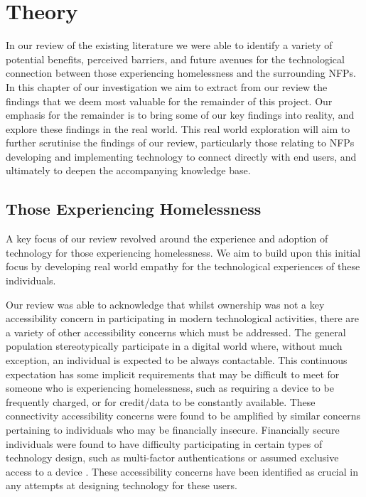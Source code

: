 \chapter{Theory}

In our review of the existing literature we were able to identify a variety of potential benefits, perceived barriers, and future avenues for the technological connection between those experiencing homelessness and the surrounding NFPs. In this chapter of our investigation we aim to extract from our review the findings that we deem most valuable for the remainder of this project. Our emphasis for the remainder is to bring some of our key findings into reality, and explore these findings in the real world. This real world exploration will aim to further scrutinise the findings of our review, particularly those relating to NFPs developing and implementing technology to connect directly with end users, and ultimately to deepen the accompanying knowledge base.

\section{Those Experiencing Homelessness}

A key focus of our review revolved around the experience and adoption of technology for those experiencing homelessness. We aim to build upon this initial focus by developing real world empathy for the technological experiences of these individuals.

Our review was able to acknowledge that whilst ownership was not a key accessibility concern in participating in modern technological activities, there are a variety of other accessibility concerns which must be addressed. The general population stereotypically participate in a digital world where, without much exception, an individual is expected to be always contactable. This continuous expectation has some implicit requirements that may be difficult to meet for someone who is experiencing homelessness, such as requiring a device to be frequently charged, or for credit/data to be constantly available. These connectivity accessibility concerns were found to be amplified by similar concerns pertaining to individuals who may be financially insecure. Financially secure individuals were found to have difficulty participating in certain types of technology design, such as multi-factor authentications or assumed exclusive access to a device \cite{sleeper2019tough}. These accessibility concerns have been identified as crucial in any attempts at designing technology for these users.

